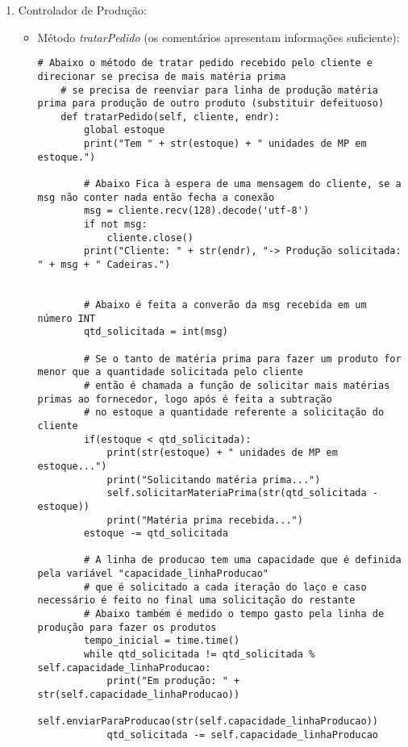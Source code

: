 \documentclass[brazil, a4paper,12pt]{article}
\begin{document}
\begin{enumerate}
\begin{itemize}
\end{itemize}

\item Controlador de Produção:

\begin{itemize}

\item Método \emph{tratarPedido} (os comentários apresentam informações suficiente):

\begin{lstlisting}[style=sd]
# Abaixo o método de tratar pedido recebido pelo cliente e direcionar se precisa de mais matéria prima
    # se precisa de reenviar para linha de produção matéria prima para produção de outro produto (substituir defeituoso)
    def tratarPedido(self, cliente, endr):
        global estoque
        print("Tem " + str(estoque) + " unidades de MP em estoque.")

        # Abaixo Fica à espera de uma mensagem do cliente, se a msg não conter nada então fecha a conexão
        msg = cliente.recv(128).decode('utf-8')
        if not msg:
            cliente.close()
        print("Cliente: " + str(endr), "-> Produção solicitada: " + msg + " Cadeiras.")


        # Abaixo é feita a converão da msg recebida em um número INT
        qtd_solicitada = int(msg)

        # Se o tanto de matéria prima para fazer um produto for menor que a quantidade solicitada pelo cliente
        # então é chamada a função de solicitar mais matérias primas ao fornecedor, logo após é feita a subtração
        # no estoque a quantidade referente a solicitação do cliente
        if(estoque < qtd_solicitada):
            print(str(estoque) + " unidades de MP em estoque...")
            print("Solicitando matéria prima...")
            self.solicitarMateriaPrima(str(qtd_solicitada - estoque))
            print("Matéria prima recebida...")
        estoque -= qtd_solicitada

        # A linha de producao tem uma capacidade que é definida pela variável "capacidade_linhaProducao"
        # que é solicitado a cada iteração do laço e caso necessário é feito no final uma solicitação do restante
        # Abaixo também é medido o tempo gasto pela linha de produção para fazer os produtos
        tempo_inicial = time.time()
        while qtd_solicitada != qtd_solicitada % self.capacidade_linhaProducao:
            print("Em produção: " + str(self.capacidade_linhaProducao))
            self.enviarParaProducao(str(self.capacidade_linhaProducao))
            qtd_solicitada -= self.capacidade_linhaProducao


\end{lstlisting}
\end{itemize}
\end{enumerate}
\end{document}

